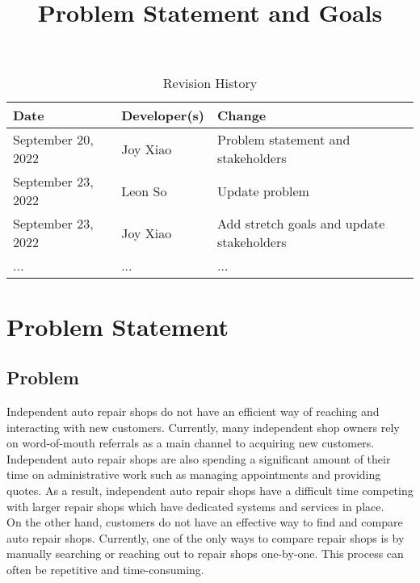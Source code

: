 \documentclass{article}
\title{Problem Statement and Goals\\\progname}
\author{\authname}
\date{}
\begin{document}
\maketitle

\begin{table}[hp]
	\caption{Revision History} \label{TblRevisionHistory}
	\begin{tabularx}{\textwidth}{llX}
		\toprule
		\textbf{Date}      & \textbf{Developer(s)} & \textbf{Change}                           \\
		\midrule
		September 20, 2022 & Joy Xiao              & Problem statement and stakeholders        \\
		September 23, 2022 & Leon So               & Update problem                            \\
		September 23, 2022 & Joy Xiao              & Add stretch goals and update stakeholders \\
		...                & ...                   & ...                                       \\
		\bottomrule
	\end{tabularx}
\end{table}

\section{Problem Statement}


\subsection{Problem}
Independent auto repair shops do not have an efficient way of reaching and interacting with new
customers. Currently, many independent shop owners rely on word-of-mouth referrals as a main
channel to acquiring new customers. Independent auto repair shops are also spending a significant
amount of their time on administrative work such as managing appointments and providing quotes. As
a result, independent auto repair shops have a difficult time competing with larger repair shops
which have dedicated systems and services in place.\\

On the other hand, customers do not have an effective way to find and compare auto repair shops.
Currently, one of the only ways to compare repair shops is by manually searching or reaching out to
repair shops one-by-one. This process can often be repetitive and time-consuming.
\end{document}
